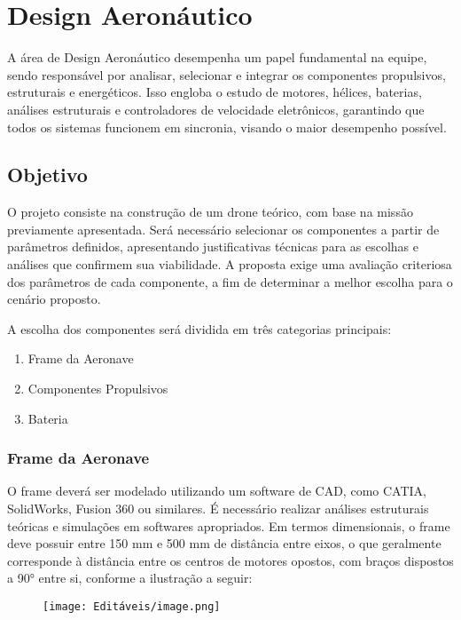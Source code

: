 \section{Design Aeronáutico}

A área de Design Aeronáutico desempenha um papel fundamental na equipe, sendo responsável por analisar, selecionar e integrar os componentes propulsivos, estruturais e energéticos. Isso engloba o estudo de motores, hélices, baterias, análises estruturais e controladores de velocidade eletrônicos, garantindo que todos os sistemas funcionem em sincronia, visando o maior desempenho possível.

\subsection*{Objetivo}

O projeto consiste na construção de um drone teórico, com base na missão previamente apresentada. Será necessário selecionar os componentes a partir de parâmetros definidos, apresentando justificativas técnicas para as escolhas e análises que confirmem sua viabilidade. A proposta exige uma avaliação criteriosa dos parâmetros de cada componente, a fim de determinar a melhor escolha para o cenário proposto.

A escolha dos componentes será dividida em três categorias principais:
\begin{enumerate}
    \item Frame da Aeronave
    \item Componentes Propulsivos
    \item Bateria
\end{enumerate}

\subsubsection*{Frame da Aeronave}

O frame deverá ser modelado utilizando um software de CAD, como CATIA, SolidWorks, Fusion 360 ou similares. É necessário realizar análises estruturais teóricas e simulações em softwares apropriados. Em termos dimensionais, o frame deve possuir entre 150 mm e 500 mm de distância entre eixos, o que geralmente corresponde à distância entre os centros de motores opostos, com braços dispostos a 90° entre si, conforme a ilustração a seguir:

    \begin{figure}[H]
    \centering
    \texttt{[image: Editáveis/image.png]}
    \label{fig:enter-label}
\end{figure}

